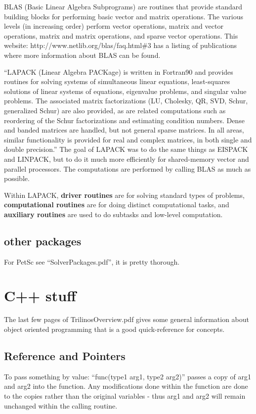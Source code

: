\documentclass[12pt,twoside]{article}
\begin{document}
BLAS (Basic Linear Algebra Subprograms) are routines that provide standard building blocks for performing basic vector and matrix operations. The various levels (in increasing order) perform vector operations, matrix and vector operations, matrix and matrix operations, and sparse vector operations. This website: http://www.netlib.org/blas/faq.html\#3 has a listing of publications where more information about BLAS can be found. 

``LAPACK (Linear Algebra PACKage) is written in Fortran90 and provides routines for solving systems of simultaneous linear equations, least-squares solutions of linear systems of equations, eigenvalue problems, and singular value problems. The associated matrix factorizations (LU, Cholesky, QR, SVD, Schur, generalized Schur) are also provided, as are related computations such as reordering of the Schur factorizations and estimating condition numbers. Dense and banded matrices are handled, but not general sparse matrices. In all areas, similar functionality is provided for real and complex matrices, in both single and double precision.'' The goal of LAPACK was to do the same things as EISPACK and LINPACK, but to do it much more efficiently for shared-memory vector and parallel processors. The computations are performed by calling BLAS as much as possible. 

Within LAPACK, \textbf{driver routines} are for solving standard types of problems, \textbf{computational routines} are for doing distinct computational tasks, and \textbf{auxiliary routines} are used to do subtasks and low-level computation. 

\subsection{other packages}
For PetSc see ``SolverPackages.pdf'', it is pretty thorough. 


\section{C++ stuff}
The last few pages of TrilinosOverview.pdf gives some general information about object oriented programming that is a good quick-reference for concepts. 
\subsection{Reference and Pointers}
To pass something by value: ``func(type1 arg1, type2 arg2)'' passes a copy of arg1 and arg2 into the function. Any modifications done within the function are done to the copies rather than the original variables - thus arg1 and arg2 will remain unchanged within the calling routine. 
\end{document}

